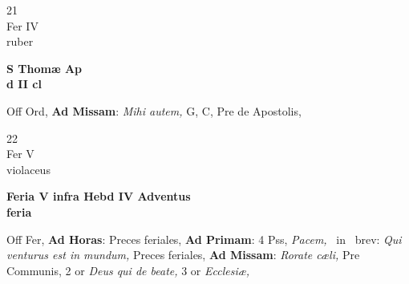 \documentclass[10pt, openany]{book}
\begin{document}
        \begin{center}
            \begin{minipage}{3.5in}
                \vspace{2em}
                \begin{minipage}{0.5in}
                    {\Huge 21} \\
                    {\normalsize Fer IV} \\
                    {\normalsize ruber}
                \end{minipage}
                \begin{minipage}{3.0in}
                    \textbf{ \large S Thomæ Ap \\
                    \textnormal{\normalsize d II cl}} \\ 
                \end{minipage}
                \begin{justify}Off Ord, \textbf{Ad Missam}: \textit{Mihi autem,} G, C, Pre de Apostolis,   
                \end{justify}
            \end{minipage}
        \end{center}
    
        \begin{center}
            \begin{minipage}{3.5in}
                \vspace{2em}
                \begin{minipage}{0.5in}
                    {\Huge 22} \\
                    {\normalsize Fer V} \\
                    {\normalsize violaceus}
                \end{minipage}
                \begin{minipage}{3.0in}
                    \textbf{ \large Feria V infra Hebd IV Adventus \\
                    \textnormal{\normalsize feria}} \\ 
                \end{minipage}
                \begin{justify}Off Fer, \textbf{Ad Horas}: Preces feriales, \textbf{Ad Primam}: 4 Pss, \textit{Pacem,} \Vbar\ in \Rbar\ brev: \textit{Qui venturus est in mundum,} Preces feriales, \textbf{Ad Missam}: \textit{Rorate cæli,} Pre Communis, 2 or \textit{Deus qui de beate,} 3 or \textit{Ecclesiæ,}   
                \end{justify}
            \end{minipage}
        \end{center}
    
\end{document}
